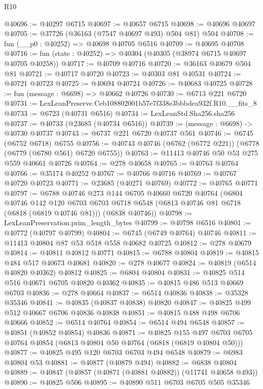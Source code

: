 \begin{lexlean}{R10}
\begin{coremodule}
@40696 := @40297 @6715
@40697 := @40657 @6715
@40698 := @40696 @40697
@40705 := @37726 (@36163 (@7547 @40697 @493) @504 @81) @504
@40708 := fun (__p0 : @40252) => @40698 @40705 @6516
@40709 := @40695 @40708
@40716 := fun (state : @40252) => @40304 (@40305 (@38974 @6715 @40697 @40705 @40258))
@40717 := @40709 @40716
@40720 := @36163 @40679 @504 @81
@40721 := @40717 @40720
@40723 := @40303 @81 @40531
@40724 := @40721 @40723
@40725 := @40694 @40724
@40726 := @40683 @40725
@40728 := fun (message : @6698) => @40662 @40726
@40730 := @6713 @221 @6720
@40731 := LexLeanPreserve.Ceb108802001b57e7f338e3bbbdea932f.R10.__fits_8
@40733 := @6723 (@40731 @6516)
@40734 := LexLeanStd.Sha256.sha256
@40737 := @40733 (@23685 (@40734 @6516))
@40739 := (message : @6698) -> @40730 @40737
@40743 := @6737 @221 @6720 @40737 @561
@40746 := @6745 (@6752 @6718) @6755
@40756 := @40743 @40746 (@6762 (@6772 @221)) (@6778 (@6779 (@6780 @561) @6720 @6755))
@40763 := @11413 @40746 @50 @53 @275 @559 @40661 @40726
@40764 := @278 @40658
@40765 := @40763 @40764
@40766 := @35174 @40252
@40767 := @40766 @40716
@40769 := @40767 @40720 @40723
@40771 := @23685 (@40271 @40769)
@40772 := @40765 @40771
@40797 := @6788
    @40746
    @273
    @144
    @6705
    @40660
    @6720
    @40764
    (@6804
      @40746
      @142
      @120
      @6703
      @6703
      @6718
      @6548
      (@6813 @40746 @81 @6718 (@6818 (@6819 @40746 @81)))
      (@6838 @40746))
@40798 := LexLeanPreservation.prim_length_bytes
@40799 := @40798 @6516
@40801 := @40772 (@40797 @40799)
@40804 := @6745 (@6749 @40764) @40746
@40811 := @11413 @40804 @87 @53 @518 @558 @40682 @40725
@40812 := @278 @40679
@40814 := @40811 @40812 @40771
@40815 := @6788 @40804
@40819 := @40815 @484 @517 @40673 @40681
@40820 := @278 @40677
@40824 := @40819 (@6514 @40820 @40362) @40812
@40825 := @6804 @40804
@40831 := @40825 @514 @516 @40671 @6705 @40820 @40362
@40835 := @40815 @486 @513 @40669 @6703
@40836 := @278 @40664
@40837 := @6514 @40836
@40838 := @35328 @35346
@40841 := @40835 (@40837 @40838) @40820
@40847 := @40825 @499 @512 @40667 @6706 @40836 @40838
@40851 := @40815 @488 @498 @6706 @40666
@40852 := @6514 @40764
@40854 := @6514 @494 @6548
@40857 := @40851 (@40852 @40854) @40836
@40871 := @40825
    @155
    @497
    @6703
    @6705
    @40764
    @40854
    (@6813 @40804 @50 @40764 (@6818 (@6819 @40804 @50)))
@40877 := @40825 @495 @120 @6703 @6703 @494 @6548
@40879 := @6983 @40804 @53
@40881 := @40877 (@40879 @494)
@40882 := @6838 @40804
@40889 := @40847 (@40857 (@40871 (@40881 @40882)) (@11741 @40658 @493))
@40890 := @40825 @506
@40895 := @40890 @511 @6703 @6705 @505 @35346

\end{coremodule}
\end{lexlean}

